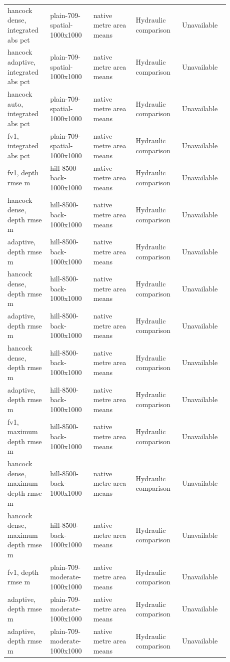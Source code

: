 \begin{longtable}{p{0.1760\linewidth}p{0.1760\linewidth}p{0.1760\linewidth}p{0.1760\linewidth}p{0.1760\linewidth}}
hancock dense, integrated abs pct & plain-709-spatial-1000x1000 & native metre area means & Hydraulic comparison & Unavailable \\
hancock adaptive, integrated abs pct & plain-709-spatial-1000x1000 & native metre area means & Hydraulic comparison & Unavailable \\
hancock auto, integrated abs pct & plain-709-spatial-1000x1000 & native metre area means & Hydraulic comparison & Unavailable \\
fv1, integrated abs pct & plain-709-spatial-1000x1000 & native metre area means & Hydraulic comparison & Unavailable \\
fv1, depth rmse m & hill-8500-back-1000x1000 & native metre area means & Hydraulic comparison & Unavailable \\
hancock dense, depth rmse m & hill-8500-back-1000x1000 & native metre area means & Hydraulic comparison & Unavailable \\
adaptive, depth rmse m & hill-8500-back-1000x1000 & native metre area means & Hydraulic comparison & Unavailable \\
hancock dense, depth rmse m & hill-8500-back-1000x1000 & native metre area means & Hydraulic comparison & Unavailable \\
adaptive, depth rmse m & hill-8500-back-1000x1000 & native metre area means & Hydraulic comparison & Unavailable \\
hancock dense, depth rmse m & hill-8500-back-1000x1000 & native metre area means & Hydraulic comparison & Unavailable \\
adaptive, depth rmse m & hill-8500-back-1000x1000 & native metre area means & Hydraulic comparison & Unavailable \\
fv1, maximum depth rmse m & hill-8500-back-1000x1000 & native metre area means & Hydraulic comparison & Unavailable \\
hancock dense, maximum depth rmse m & hill-8500-back-1000x1000 & native metre area means & Hydraulic comparison & Unavailable \\
hancock dense, maximum depth rmse m & hill-8500-back-1000x1000 & native metre area means & Hydraulic comparison & Unavailable \\
fv1, depth rmse m & plain-709-moderate-1000x1000 & native metre area means & Hydraulic comparison & Unavailable \\
adaptive, depth rmse m & plain-709-moderate-1000x1000 & native metre area means & Hydraulic comparison & Unavailable \\
adaptive, depth rmse m & plain-709-moderate-1000x1000 & native metre area means & Hydraulic comparison & Unavailable \\

\end{longtable}
